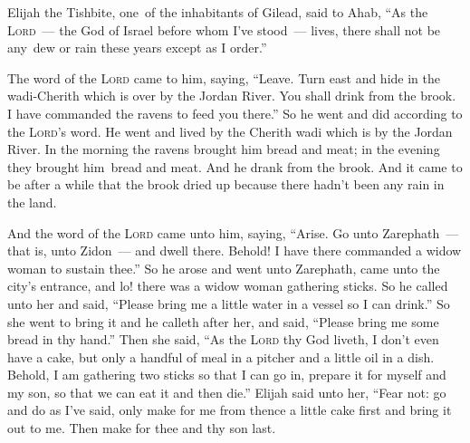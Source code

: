 
\begin{inparaenum}
   Elijah the Tishbite, one\understood\ of the inhabitants of Gilead, said to Ahab, ``As the \textsc{Lord}~--- the God of Israel before whom I've stood~--- lives, there shall not be any\understood\ dew or rain these years except as I order.''%
  
   The word of the \textsc{Lord} came to him, saying,%
   ``Leave. Turn east and hide in the wadi-Cherith which is over by the Jordan River.\understood%
   You shall drink from the brook. I have commanded the ravens to feed you there.''%
   So he went and did according to the \textsc{Lord}'s word. He went and lived by the Cherith wadi which is by the Jordan River.%
   In the morning the ravens brought him bread and meat; in the evening they brought him\understood\ bread and meat. And he drank from the brook.%
   And it came to be after a while that the brook dried up because there hadn't been any rain in the land.%
  
   And the word of the \textsc{Lord} came unto him, saying,%
   ``Arise. Go unto Zarephath~--- that is, unto Zidon~--- and dwell there. Behold! I have there commanded a widow woman to sustain thee.''%
   So he arose and went unto Zarephath, came unto the city's entrance, and lo! there was a widow woman gathering sticks. So he called unto her and said, ``Please bring me a little water in a vessel so I can drink.''%
   So she went to bring it and he calleth after her, and said, ``Please bring me some bread in thy hand.''%
   Then she said, ``As the \textsc{Lord} thy God liveth, I don't even have a cake, but only a handful of meal in a pitcher and a little oil in a dish. Behold, I am gathering two sticks so that I can go in, prepare it for myself and my son, so that we can eat it and then die.''%
   Elijah said unto her, ``Fear not: go and do as I've said, only make for me from thence a little cake first and bring it out to me. Then make for thee and thy son last.%
  

\end{inparaenum}
